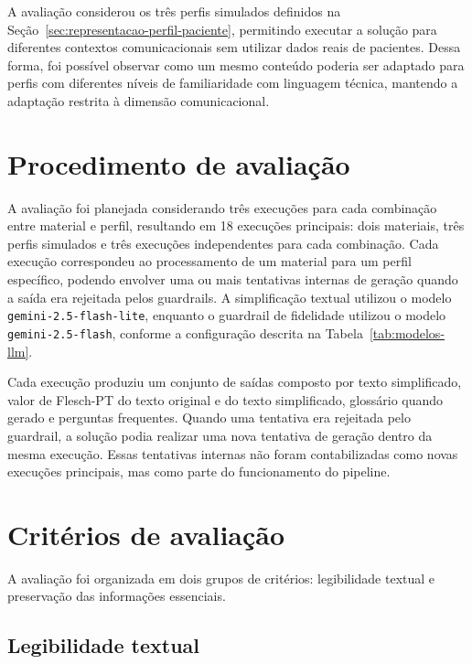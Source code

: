 A avaliação considerou os três perfis simulados definidos na Seção~\ref{sec:representacao-perfil-paciente}, permitindo executar a solução para diferentes contextos comunicacionais sem utilizar dados reais de pacientes. Dessa forma, foi possível observar como um mesmo conteúdo poderia ser adaptado para perfis com diferentes níveis de familiaridade com linguagem técnica, mantendo a adaptação restrita à dimensão comunicacional.

\section{Procedimento de avaliação}
\label{sec:procedimento-avaliacao}

A avaliação foi planejada considerando três execuções para cada combinação entre material e perfil, resultando em 18 execuções principais: dois materiais, três perfis simulados e três execuções independentes para cada combinação. Cada execução correspondeu ao processamento de um material para um perfil específico, podendo envolver uma ou mais tentativas internas de geração quando a saída era rejeitada pelos guardrails. A simplificação textual utilizou o modelo \texttt{gemini-2.5-flash-lite}, enquanto o guardrail de fidelidade utilizou o modelo \texttt{gemini-2.5-flash}, conforme a configuração descrita na Tabela~\ref{tab:modelos-llm}.

Cada execução produziu um conjunto de saídas composto por texto simplificado, valor de Flesch-PT do texto original e do texto simplificado, glossário quando gerado e perguntas frequentes. Quando uma tentativa era rejeitada pelo guardrail, a solução podia realizar uma nova tentativa de geração dentro da mesma execução. Essas tentativas internas não foram contabilizadas como novas execuções principais, mas como parte do funcionamento do pipeline.

\section{Critérios de avaliação}
\label{sec:criterios-avaliacao}

A avaliação foi organizada em dois grupos de critérios: legibilidade textual e preservação das informações essenciais.

\subsection{Legibilidade textual}
\label{subsec:legibilidade-textual-avaliacao}

